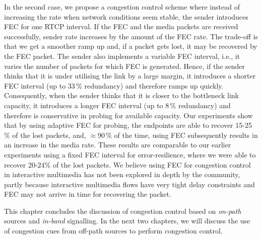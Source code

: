 In the second case, we propose a congestion control scheme where instead of
increasing the rate when network conditions seem stable, the sender introduces
FEC for one RTCP interval. If the FEC and the media packets are received
successfully, sender rate increases by the amount of the FEC rate.
The trade-off is that we get a smoother ramp up and, if a packet gets
lost, it may be recovered by the FEC packet. The sender also implements a
variable FEC interval, i.e., it varies the number of packets for which FEC is
generated. Hence, if the sender thinks that it is under utilising the link by a
large margin, it introduces a shorter FEC interval (up to 33\,\% redundancy)
and therefore ramps up quickly. Consequently, when the sender thinks that it is closer
to the bottleneck link capacity, it introduces a longer FEC interval (up to
8\,\% redundancy) and therefore is conservative in probing for available
capacity. Our experiments show that by using adaptive FEC for probing, the
endpoints are able to recover 15-25\,\% of the lost packets, and,
$\approx$90\,\% of the time, using FEC subsequently results in an increase in
the media rate. These results are comparable to our earlier experiments using
a fixed FEC interval for error-resilience, where we were able to recover
20-24\;\% of the lost packets. We believe using FEC for congestion control in
interactive multimedia has not been explored in depth by the community, partly
because interactive multimedia flows have very tight delay constraints and FEC
may not arrive in time for recovering the packet.

This chapter concludes the discussion of congestion control based on
\emph{on-path} sources and \emph{in-band} signalling. In the next two chapters, we will
discuss the use of congestion cues from off-path sources to perform congestion
control.
